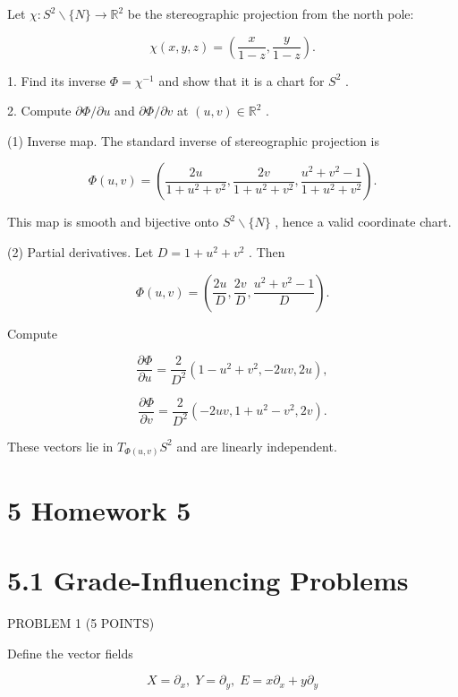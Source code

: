 \documentclass[10pt]{article}
\begin{document}
\begin{problem}[title=PROBLEM 6 (6 POINTS)]
Let \(\chi  : {S}^{2} \smallsetminus  \{ N\}  \rightarrow  {\mathbb{R}}^{2}\) be the stereographic projection from the north pole:

\[
\chi \left( {x,y,z}\right)  = \left( {\frac{x}{1 - z},\frac{y}{1 - z}}\right) .
\]

1. Find its inverse \(\Phi  = {\chi }^{-1}\) and show that it is a chart for \({S}^{2}\) .

2. Compute \(\partial \Phi /\partial u\) and \(\partial \Phi /\partial v\) at \(\left( {u,v}\right)  \in  {\mathbb{R}}^{2}\) .

(1) Inverse map. The standard inverse of stereographic projection is

\[
\Phi \left( {u,v}\right)  = \left( {\frac{2u}{1 + {u}^{2} + {v}^{2}},\frac{2v}{1 + {u}^{2} + {v}^{2}},\frac{{u}^{2} + {v}^{2} - 1}{1 + {u}^{2} + {v}^{2}}}\right) .
\]

This map is smooth and bijective onto \({S}^{2} \smallsetminus  \{ N\}\) , hence a valid coordinate chart.

(2) Partial derivatives. Let \(D = 1 + {u}^{2} + {v}^{2}\) . Then

\[
\Phi \left( {u,v}\right)  = \left( {\frac{2u}{D},\frac{2v}{D},\frac{{u}^{2} + {v}^{2} - 1}{D}}\right) .
\]

Compute

\[
\frac{\partial \Phi }{\partial u} = \frac{2}{{D}^{2}}\left( {1 - {u}^{2} + {v}^{2}, - {2uv},{2u}}\right) ,
\]

\[
\frac{\partial \Phi }{\partial v} = \frac{2}{{D}^{2}}\left( {-{2uv},1 + {u}^{2} - {v}^{2},{2v}}\right) .
\]

These vectors lie in \({T}_{\Phi \left( {u,v}\right) }{S}^{2}\) and are linearly independent.
\end{problem}

\section*{5 Homework 5}

\section*{5.1 Grade-Influencing Problems}

PROBLEM 1 (5 POINTS)

Define the vector fields

\[
X = {\partial }_{x},\;Y = {\partial }_{y},\;E = x{\partial }_{x} + y{\partial }_{y}
\]
\end{document}

